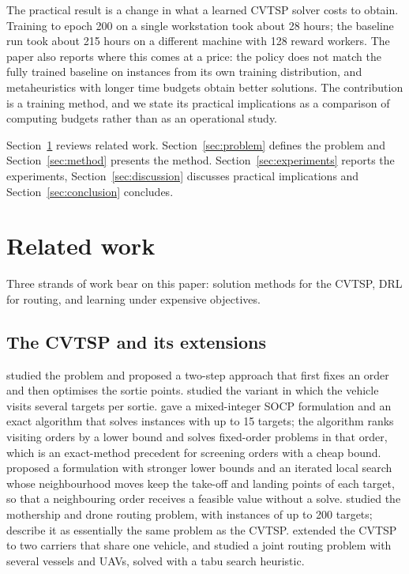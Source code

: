 \documentclass[preprint,12pt,authoryear]{elsarticle}
\begin{document}
The practical result is a change in what a learned CVTSP solver costs to obtain. Training to epoch 200 on a single workstation took about 28 hours; the baseline run took about 215 hours on a different machine with 128 reward workers. The paper also reports where this comes at a price: the policy does not match the fully trained baseline on instances from its own training distribution, and metaheuristics with longer time budgets obtain better solutions. The contribution is a training method, and we state its practical implications as a comparison of computing budgets rather than as an operational study.

Section~\ref{sec:related} reviews related work. Section~\ref{sec:problem} defines the problem and Section~\ref{sec:method} presents the method. Section~\ref{sec:experiments} reports the experiments, Section~\ref{sec:discussion} discusses practical implications and Section~\ref{sec:conclusion} concludes.

\section{Related work}
\label{sec:related}

Three strands of work bear on this paper: solution methods for the CVTSP, DRL for routing, and learning under expensive objectives.

\subsection{The CVTSP and its extensions}

\citet{garone2011} studied the problem and proposed a two-step approach that first fixes an order and then optimises the sortie points. \citet{garone2014} studied the variant in which the vehicle visits several targets per sortie. \citet{gambella2018} gave a mixed-integer SOCP formulation and an exact algorithm that solves instances with up to 15 targets; the algorithm ranks visiting orders by a lower bound and solves fixed-order problems in that order, which is an exact-method precedent for screening orders with a cheap bound. \citet{erdogan2021} proposed a formulation with stronger lower bounds and an iterated local search whose neighbourhood moves keep the take-off and landing points of each target, so that a neighbouring order receives a feasible value without a solve. \citet{poikonen2020} studied the mothership and drone routing problem, with instances of up to 200 targets; \citet{erdogan2021} describe it as essentially the same problem as the CVTSP. \citet{fahradyan2020} extended the CVTSP to two carriers that share one vehicle, and \citet{liy2024} studied a joint routing problem with several vessels and UAVs, solved with a tabu search heuristic.
\end{document}
